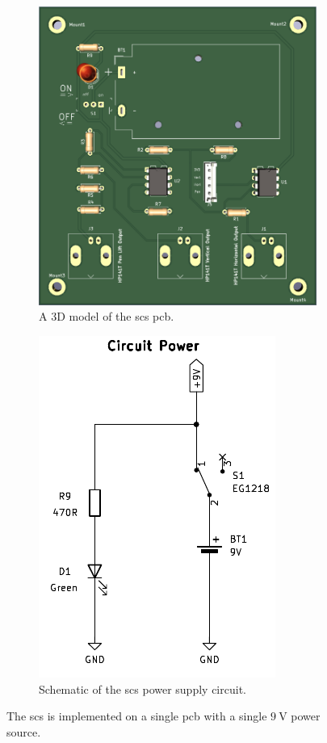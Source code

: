 \documentclass[class=report,11pt,crop=false]{standalone}
\begin{document}
	\begin{figure}[ht!]
		\centering
		\begin{subfigure}{.5\textwidth}
			\centering
			\includegraphics[width=0.7\linewidth]{Figures/Methodology/scs-pcb}
			\caption{A 3D model of the \acrshort{scs} \acrshort{pcb}.}
			\label{fig:scs-pcb}
		\end{subfigure}%
		\begin{subfigure}{.5\textwidth}
			\centering
			\includegraphics[width=0.57\linewidth]{Figures/Methodology/scs-power-schematic}
			\caption{Schematic of the \acrshort{scs} power supply circuit.}
			\label{fig:scs-power-schematic}
		\end{subfigure}
		\caption{The \acrshort{scs} is implemented on a single \acrshort{pcb} with a single $\SI{9}{\volt}$ power source.}
		\label{fig:scs-full-subsystem}
	\end{figure}
\end{document}
